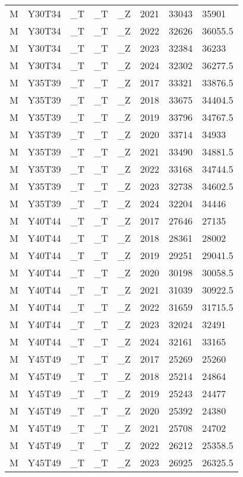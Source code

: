 \begin{longtable}[t]{llllllll}
M & Y30T34 & \_T & \_T & \_Z & 2021 & 33043 & 35901\\
M & Y30T34 & \_T & \_T & \_Z & 2022 & 32626 & 36055.5\\
\addlinespace
M & Y30T34 & \_T & \_T & \_Z & 2023 & 32384 & 36233\\
M & Y30T34 & \_T & \_T & \_Z & 2024 & 32302 & 36277.5\\
M & Y35T39 & \_T & \_T & \_Z & 2017 & 33321 & 33876.5\\
M & Y35T39 & \_T & \_T & \_Z & 2018 & 33675 & 34404.5\\
M & Y35T39 & \_T & \_T & \_Z & 2019 & 33796 & 34767.5\\
\addlinespace
M & Y35T39 & \_T & \_T & \_Z & 2020 & 33714 & 34933\\
M & Y35T39 & \_T & \_T & \_Z & 2021 & 33490 & 34881.5\\
M & Y35T39 & \_T & \_T & \_Z & 2022 & 33168 & 34744.5\\
M & Y35T39 & \_T & \_T & \_Z & 2023 & 32738 & 34602.5\\
M & Y35T39 & \_T & \_T & \_Z & 2024 & 32204 & 34446\\
\addlinespace
M & Y40T44 & \_T & \_T & \_Z & 2017 & 27646 & 27135\\
M & Y40T44 & \_T & \_T & \_Z & 2018 & 28361 & 28002\\
M & Y40T44 & \_T & \_T & \_Z & 2019 & 29251 & 29041.5\\
M & Y40T44 & \_T & \_T & \_Z & 2020 & 30198 & 30058.5\\
M & Y40T44 & \_T & \_T & \_Z & 2021 & 31039 & 30922.5\\
\addlinespace
M & Y40T44 & \_T & \_T & \_Z & 2022 & 31659 & 31715.5\\
M & Y40T44 & \_T & \_T & \_Z & 2023 & 32024 & 32491\\
M & Y40T44 & \_T & \_T & \_Z & 2024 & 32161 & 33165\\
M & Y45T49 & \_T & \_T & \_Z & 2017 & 25269 & 25260\\
M & Y45T49 & \_T & \_T & \_Z & 2018 & 25214 & 24864\\
\addlinespace
M & Y45T49 & \_T & \_T & \_Z & 2019 & 25243 & 24477\\
M & Y45T49 & \_T & \_T & \_Z & 2020 & 25392 & 24380\\
M & Y45T49 & \_T & \_T & \_Z & 2021 & 25708 & 24702\\
M & Y45T49 & \_T & \_T & \_Z & 2022 & 26212 & 25358.5\\
M & Y45T49 & \_T & \_T & \_Z & 2023 & 26925 & 26325.5\\

\end{longtable}
